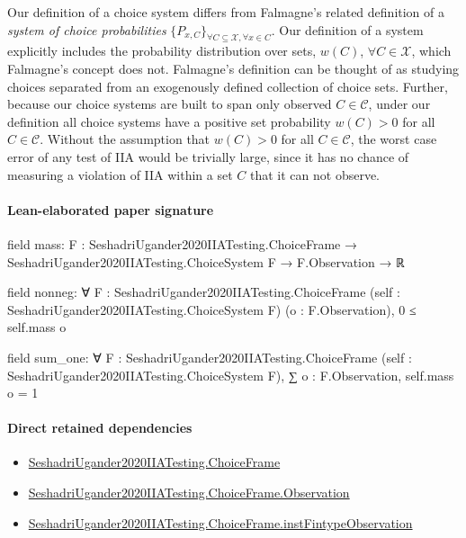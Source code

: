 \documentclass[10pt]{article}
\begin{document}
\begin{ReviewVerbatim}
	Our definition of a choice system differs from Falmagne's \cite{falmagne1978representation,barbera1986falmagne} related definition of a {\it system of choice probabilities} $\{P_{x,C}\}_{\forall C \subseteq \mathcal X, \forall x \in C}$. Our definition of a system explicitly includes the probability distribution over sets, $w(C)$, $\forall C \in \mathcal X$, which Falmagne's concept does not. Falmagne's definition can be thought of as studying choices separated from an exogenously defined collection of choice sets. Further, because our choice systems are built to span only observed $C \in \mathcal{C}$, under our definition all choice systems have a positive set probability $w(C)>0$ for all $C \in \mathcal{C}$. Without the assumption that $w(C)>0$ for all $C \in \mathcal{C}$, the worst case error of any test of IIA would be trivially large, since it has no chance of measuring a violation of IIA within a set $C$ that it can not observe.
\end{ReviewVerbatim}



\paragraph{Lean-elaborated paper signature}
\begin{ReviewVerbatim}
field mass:
{F : SeshadriUgander2020IIATesting.ChoiceFrame} → SeshadriUgander2020IIATesting.ChoiceSystem F → F.Observation → ℝ

field nonneg:
∀ {F : SeshadriUgander2020IIATesting.ChoiceFrame} (self : SeshadriUgander2020IIATesting.ChoiceSystem F)
  (o : F.Observation), 0 ≤ self.mass o

field sum_one:
∀ {F : SeshadriUgander2020IIATesting.ChoiceFrame} (self : SeshadriUgander2020IIATesting.ChoiceSystem F),
  ∑ o : F.Observation, self.mass o = 1
\end{ReviewVerbatim}

\paragraph{Direct retained dependencies}
\begin{itemize}\raggedright
\item \hyperlink{paper-prerequisite-0b24d39c6f4d1898}{Seshadri\allowbreak{}Ugander2020\allowbreak{}IIA\allowbreak{}Testing.\allowbreak{}Choice\allowbreak{}Frame}
\item \hyperlink{paper-prerequisite-d450557e9618e377}{Seshadri\allowbreak{}Ugander2020\allowbreak{}IIA\allowbreak{}Testing.\allowbreak{}Choice\allowbreak{}Frame.\allowbreak{}Observation}
\item \hyperlink{governing-declaration-a7119ec24e922f45}{Seshadri\allowbreak{}Ugander2020\allowbreak{}IIA\allowbreak{}Testing.\allowbreak{}Choice\allowbreak{}Frame.\allowbreak{}inst\allowbreak{}Fintype\allowbreak{}Observation}
\end{itemize}
\end{document}
